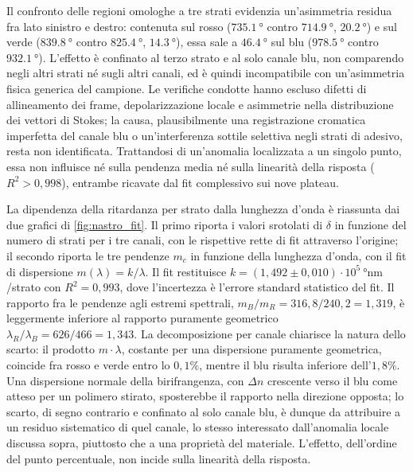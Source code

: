 Il confronto delle regioni omologhe a tre strati evidenzia un'asimmetria residua fra lato sinistro e destro: contenuta sul rosso ($\SI{735.1}{\degree}$ contro $\SI{714.9}{\degree}$, $\SI{20.2}{\degree}$) e sul verde ($\SI{839.8}{\degree}$ contro $\SI{825.4}{\degree}$, $\SI{14.3}{\degree}$), essa sale a $\SI{46.4}{\degree}$ sul blu ($\SI{978.5}{\degree}$ contro $\SI{932.1}{\degree}$). L'effetto è confinato al terzo strato e al solo canale blu, non comparendo negli altri strati né sugli altri canali, ed è quindi incompatibile con un'asimmetria fisica generica del campione. Le verifiche condotte hanno escluso difetti di allineamento dei frame, depolarizzazione locale e asimmetrie nella distribuzione dei vettori di Stokes; la causa, plausibilmente una registrazione cromatica imperfetta del canale blu o un'interferenza sottile selettiva negli strati di adesivo, resta non identificata. Trattandosi di un'anomalia localizzata a un singolo punto, essa non influisce né sulla pendenza media né sulla linearità della risposta ($R^2 > 0{,}998$), entrambe ricavate dal fit complessivo sui nove plateau.

La dipendenza della ritardanza per strato dalla lunghezza d'onda è riassunta dai due grafici di \cref{fig:nastro_fit}. Il primo riporta i valori srotolati di $\delta$ in funzione del numero di strati per i tre canali, con le rispettive rette di fit attraverso l'origine; il secondo riporta le tre pendenze $m_c$ in funzione della lunghezza d'onda, con il fit di dispersione $m(\lambda) = k/\lambda$. Il fit restituisce $k = (1{,}492 \pm 0{,}010)\cdot10^{5}~\si{\degree\nano\meter}$/strato con $R^2 = 0{,}993$, dove l'incertezza è l'errore standard statistico del fit. Il rapporto fra le pendenze agli estremi spettrali, $m_B/m_R = 316{,}8/240{,}2 = 1{,}319$, è leggermente inferiore al rapporto puramente geometrico $\lambda_R/\lambda_B = 626/466 = 1{,}343$. La decomposizione per canale chiarisce la natura dello scarto: il prodotto $m \cdot \lambda$, costante per una dispersione puramente geometrica, coincide fra rosso e verde entro lo $0{,}1\%$, mentre il blu risulta inferiore dell'$1{,}8\%$. Una dispersione normale della birifrangenza, con $\Delta n$ crescente verso il blu come atteso per un polimero stirato, sposterebbe il rapporto nella direzione opposta; lo scarto, di segno contrario e confinato al solo canale blu, è dunque da attribuire a un residuo sistematico di quel canale, lo stesso interessato dall'anomalia locale discussa sopra, piuttosto che a una proprietà del materiale. L'effetto, dell'ordine del punto percentuale, non incide sulla linearità della risposta.

